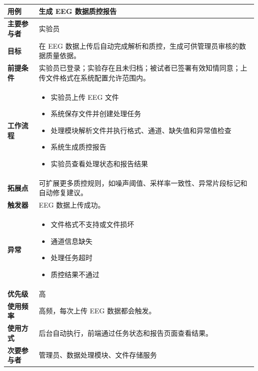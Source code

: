 \begin{table}[H]
    \centering
    \begin{tabular}{|p{3cm}|p{11.5cm}|}
        \hline
        \textbf{用例} & 生成 EEG 数据质控报告 \\
        \hline
        \textbf{主要参与者} & 实验员 \\
        \hline
        \textbf{目标} & 在 EEG 数据上传后自动完成解析和质控，生成可供管理员审核的数据质量依据。 \\
        \hline
        \textbf{前提条件} & 实验员已登录；实验存在且未归档；被试者已签署有效知情同意；上传文件格式在系统配置允许范围内。 \\
        \hline
        \textbf{工作流程} &
        \vspace{-0.3cm}
        \begin{itemize}
            \item 实验员上传 EEG 文件
            \item 系统保存文件并创建处理任务
            \item 处理模块解析文件并执行格式、通道、缺失值和异常值检查
            \item 系统生成质控报告
            \item 实验员查看处理状态和报告结果
        \end{itemize} \vspace{-0.3cm} \\
        \hline
        \textbf{拓展点} & 可扩展更多质控规则，如噪声阈值、采样率一致性、异常片段标记和自动修复建议。 \\
        \hline
        \textbf{触发器} & EEG 数据上传成功。 \\
        \hline
        \textbf{异常} &
        \vspace{-0.3cm}
        \begin{itemize}
            \item 文件格式不支持或文件损坏
            \item 通道信息缺失
            \item 处理任务超时
            \item 质控结果不通过
        \end{itemize} \vspace{-0.3cm} \\
        \hline
        \textbf{优先级} & 高 \\
        \hline
        \textbf{使用频率} & 高频，每次上传 EEG 数据都会触发。 \\
        \hline
        \textbf{使用方式} & 后台自动执行，前端通过任务状态和报告页面查看结果。 \\
        \hline
        \textbf{次要参与者} & 管理员、数据处理模块、文件存储服务 \\
        \hline
    \end{tabular}
\end{table}

